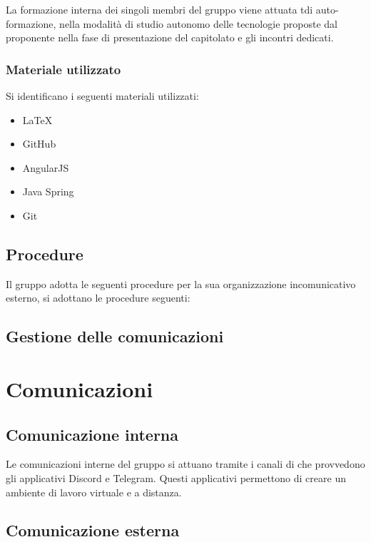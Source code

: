 La formazione interna dei singoli membri del gruppo viene attuata t\atica di auto-formazione, nella modalità di studio autonomo delle tecnologie proposte dal proponente nella fase di presentazione del capitolato e gli incontri dedicati.

\subsubsection{Materiale utilizzato}

Si identificano i seguenti materiali utilizzati:

\begin{itemize}
\item LaTeX
\item GitHub
\item AngularJS
\item Java Spring
\item Git
\end{itemize}

\subsection{Procedure}

Il gruppo adotta le seguenti procedure per la sua organizzazione in\lusso comunicativo esterno, si adottano le procedure seguenti:

\subsection{Gestione delle comunicazioni}

\section{Comunicazioni}

\subsection{Comunicazione interna}

Le comunicazioni interne del gruppo si attuano tramite i canali di \e che provvedono gli applicativi Discord e Telegram. Questi applicativi permettono di creare un ambiente di lavoro virtuale e a distanza.

\subsection{Comunicazione esterna}

